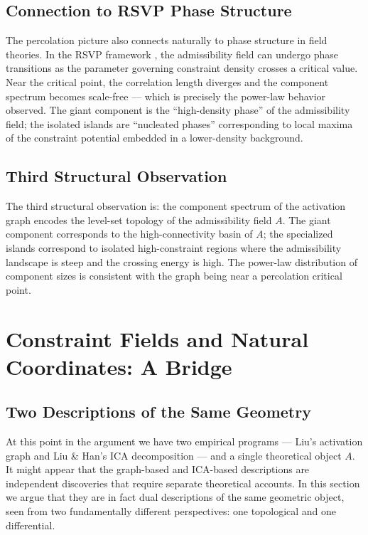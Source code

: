 \documentclass[12pt, a4paper]{article}
\theoremstyle{plain}
\theoremstyle{definition}
\theoremstyle{remark}
\newcommand{\fA}{A}
\begin{document}
\subsection{Connection to RSVP Phase Structure}

The percolation picture also connects naturally to phase structure in field
theories. In the RSVP framework \cite{flyxion2026admissibility}, the
admissibility field can undergo phase transitions as the parameter governing
constraint density crosses a critical value. Near the critical point, the
correlation length diverges and the component spectrum becomes scale-free ---
which is precisely the power-law behavior observed. The giant component is the
``high-density phase'' of the admissibility field; the isolated islands are
``nucleated phases'' corresponding to local maxima of the constraint potential
embedded in a lower-density background.

\subsection{Third Structural Observation}

The third structural observation is: the component spectrum of the activation
graph encodes the level-set topology of the admissibility field $\fA$. The
giant component corresponds to the high-connectivity basin of $\fA$; the
specialized islands correspond to isolated high-constraint regions where the
admissibility landscape is steep and the crossing energy is high. The
power-law distribution of component sizes is consistent with the graph being
near a percolation critical point.

\section{Constraint Fields and Natural Coordinates: A Bridge}

\subsection{Two Descriptions of the Same Geometry}

At this point in the argument we have two empirical programs --- Liu's
activation graph and Liu \& Han's ICA decomposition --- and a single theoretical
object $\fA$. It might appear that the graph-based and ICA-based descriptions
are independent discoveries that require separate theoretical accounts. In this
section we argue that they are in fact dual descriptions of the same geometric
object, seen from two fundamentally different perspectives: one topological and
one differential.
\end{document}
